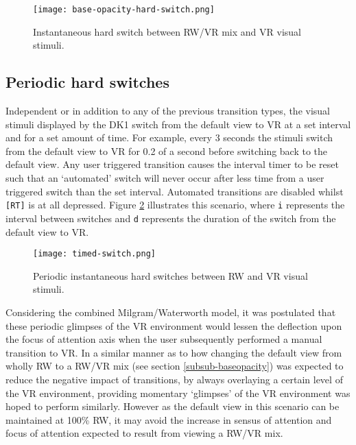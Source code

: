 \begin{figure}[h]
	\begin{center}
		\texttt{[image: base-opacity-hard-switch.png]}
		\caption{Instantaneous hard switch between RW/VR mix and VR visual stimuli.}
		\label{scenariobaseopacity}
	\end{center}
\end{figure}


\subsection{Periodic hard switches}
\label{subsub-periodic}
Independent or in addition to any of the previous transition types, the visual stimuli displayed by the DK1 switch from the default view to VR at a set interval and for a set amount of time. For example, every 3 seconds the stimuli switch from the default view to VR for 0.2 of a second before switching back to the default view. Any user triggered transition causes the interval timer to be reset such that an `automated' switch will never occur after less time from a user triggered switch than the set interval. Automated transitions are disabled whilst \texttt{[RT]} is at all depressed. Figure \ref{scenariotimed} illustrates this scenario, where \texttt{i} represents the interval between switches and \texttt{d} represents the duration of the switch from the default view to VR.

\begin{figure}[h]
	\begin{center}
		\texttt{[image: timed-switch.png]}
		\caption{Periodic instantaneous hard switches between RW and VR visual stimuli.}
		\label{scenariotimed}
	\end{center}
\end{figure}

Considering the combined Milgram/Waterworth model, it was postulated that these periodic glimpses of the VR environment would lessen the deflection upon the focus of attention axis when the user subsequently performed a manual transition to VR. In a similar manner as to how changing the default view from wholly RW to a RW/VR mix (see section \ref{subsub-baseopacity}) was expected to reduce the negative impact of transitions, by always overlaying a certain level of the VR environment, providing momentary `glimpses' of the VR environment was hoped to perform similarly. However as the default view in this scenario can be maintained at 100\% RW, it may avoid the increase in sensus of attention and focus of attention expected to result from viewing a RW/VR mix.

